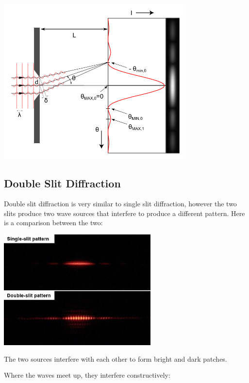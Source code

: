 \documentclass[a4paper, 12pt]{article}
\begin{document}
\begin{center}
\includegraphics[height=8.5cm]{images/singleSlit.png}
\end{center}

\subsection{Double Slit Diffraction}

Double slit diffraction is very similar to single slit diffraction, however the two slits produce two wave sources that interfere to produce a different pattern. Here is a comparison between the two:

\begin{center}
\includegraphics[width=0.6\textwidth]{images/slitDIffCompare.jpg}
\end{center}

The two sources interfere with each other to form bright and dark patches.

Where the waves meet up, they interfere constructively:
\end{document}

